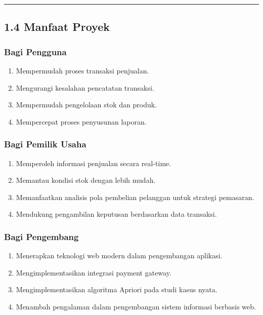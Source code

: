 \begin{center}\rule{0.5\linewidth}{0.5pt}\end{center}

\subsection{1.4 Manfaat Proyek}\label{manfaat-proyek}

\subsubsection{Bagi Pengguna}\label{bagi-pengguna}

\begin{enumerate}
\def\labelenumi{\arabic{enumi}.}
\tightlist
\item
  Mempermudah proses transaksi penjualan.
\item
  Mengurangi kesalahan pencatatan transaksi.
\item
  Mempermudah pengelolaan stok dan produk.
\item
  Mempercepat proses penyusunan laporan.
\end{enumerate}

\subsubsection{Bagi Pemilik Usaha}\label{bagi-pemilik-usaha}

\begin{enumerate}
\def\labelenumi{\arabic{enumi}.}
\tightlist
\item
  Memperoleh informasi penjualan secara real-time.
\item
  Memantau kondisi stok dengan lebih mudah.
\item
  Memanfaatkan analisis pola pembelian pelanggan untuk strategi pemasaran.
\item
  Mendukung pengambilan keputusan berdasarkan data transaksi.
\end{enumerate}

\subsubsection{Bagi Pengembang}\label{bagi-pengembang}

\begin{enumerate}
\def\labelenumi{\arabic{enumi}.}
\tightlist
\item
  Menerapkan teknologi web modern dalam pengembangan aplikasi.
\item
  Mengimplementasikan integrasi payment gateway.
\item
  Mengimplementasikan algoritma Apriori pada studi kasus nyata.
\item
  Menambah pengalaman dalam pengembangan sistem informasi berbasis web.
\end{enumerate}

